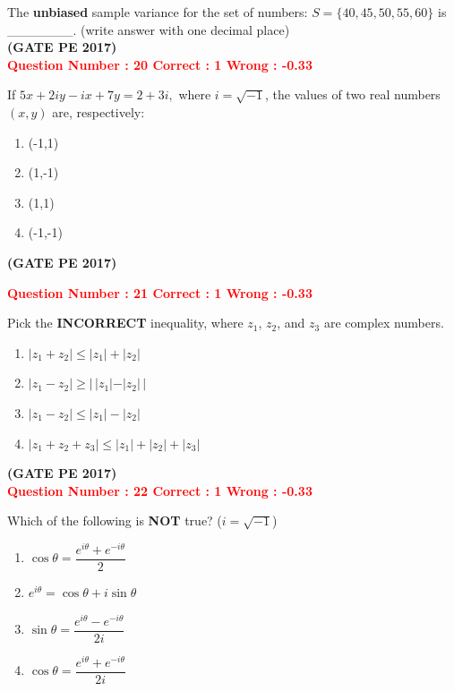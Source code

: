 \documentclass[journal,12pt,onecolumn]{article}
\begin{document}
{The \textbf{unbiased} sample variance for the set of numbers: $S = \{40, 45, 50, 55, 60\}$ is \_\_\_\_\_\_\_. (write answer with one decimal place)\\

\hfill\textbf{(GATE PE 2017)}\\[0.6cm]


\textcolor{red}{\textbf{Question Number : 20 \hfill Correct : 1  Wrong : -0.33}}

If {\LARGE$ 
5x + 2iy - ix + 7y = 2 + 3i,
$ }
where $i = \sqrt{-1}$, the values of two real numbers $(x, y)$ are, respectively:

\begin{enumerate}[label=(\Alph*)]
    \item (-1,1)
    \item (1,-1)
    \item (1,1)
    \item (-1,-1)
\end{enumerate}
\hfill\textbf{(GATE PE 2017)}\\[0.6cm]

\newpage

\textcolor{red}{\textbf{Question Number : 21 \hfill Correct : 1  Wrong : -0.33}}

Pick the \textbf{INCORRECT} inequality, where $z_1$, $z_2$, and $z_3$ are complex numbers.

\begin{enumerate}[label=(\Alph*)]
    \item $|z_1 + z_2| \leq |z_1| + |z_2|$
    \item $|z_1 - z_2| \geq |\,|z_1| - |z_2|\,|$
    \item $|z_1 - z_2| \leq |z_1| - |z_2|$
    \item $|z_1 + z_2 + z_3| \leq |z_1| + |z_2| + |z_3|$
\end{enumerate}

\hfill\textbf{(GATE PE 2017)}\\[0.6cm]

\textcolor{red}{\textbf{Question Number : 22 \hfill Correct : 1  Wrong : -0.33}}

Which of the following is \textbf{NOT} true? \quad ($i = \sqrt{-1}$)

\begin{enumerate}[label=(\Alph*)]
    \item $\cos \theta = \dfrac{e^{i\theta} + e^{-i\theta}}{2}$
    \item $e^{i\theta} = \cos \theta + i \sin \theta$
    \item $\sin \theta = \dfrac{e^{i\theta} - e^{-i\theta}}{2i}$
    \item $\cos \theta = \dfrac{e^{i\theta} + e^{-i\theta}}{2i}$
\end{enumerate}

}
\end{document}
